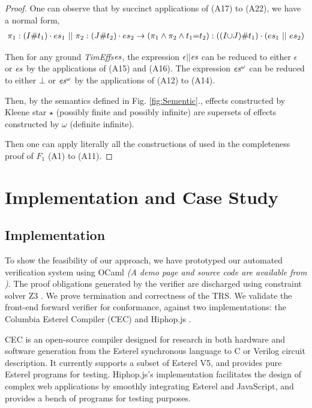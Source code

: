 \documentclass[acmsmall,10pt,review]{acmart}
\newcommand{\es}{\textcolor{black}{\ensuremath{{es}}}}
\newcommand{\timedEffects}{\emph{TimEffs}}
\newcommand{\code}[1]{{\tt{\ensuremath{\m{#1}}}}}
\newcommand{\m}{\mathit}
\newcommand\figref[1]{Fig. \textcolor{black}{\ref{#1}}.}
\begin{document}
\begin{proof} 
One can observe that by succinct applications of (A17) to (A22), we have a normal form, 
\begin{align}
\pi_1 : (I\# t_1) \cdot \es_1\ ||\ \pi_2 :  (J\# t_2) \cdot\es_2 \rightarrow  (\pi_1 \wedge \pi_2 \wedge t_1{=}t_2) :  ((I  {\cup} J) \# t_1) \cdot (\es_1\ ||\ \es_2)
\end{align}

Then for any ground \timedEffects \code{\es}, the expression \code{\epsilon || \es} can be reduced to either \code{\epsilon} or \code{\es} by the applications of (A15) and (A16).  
The expression \code{\es^\omega} can be reduced to either \code{\bot} or \code{\es^\omega} by the applications of (A12) to (A14).  

Then, by the semantics defined in \figref{fig:Sementic}, effects constructed by Kleene star \code{\star} (possibly finite and possibly infinite) are supersets of effects constructed by \code{\omega} (definite infinite). 

Then one can apply literally all the constructions of \cite{salomaa1966two} used in the completeness proof of \code{F_1} (A1) to (A11).


\end{proof}




\section{Implementation and Case Study}
\label{sec:Evaluation}

\subsection{Implementation}
To show the feasibility of our approach, we have prototyped our automated verification system 
using OCaml \emph{(A demo page  and source code are available from \cite{CODE})}. 
The proof obligations generated by the verifier are discharged using constraint solver Z3 \citep{de2008z3}. 
We prove termination and correctness of the TRS. We validate the front-end forward verifier for conformance, against two implementations: the Columbia Esterel Compiler (CEC) 
\cite{CEC} and Hiphop.js \cite{HH_im}. 


CEC is an open-source compiler designed for research in both hardware and software generation from the Esterel synchronous language to C or Verilog circuit description. It currently supports a subset of Esterel V5, and provides pure Esterel programs for testing. Hiphop.js's implementation facilitates the design of complex web applications by smoothly integrating Esterel and JavaScript, and provides a bench of programs for testing purposes. 
\end{document}
